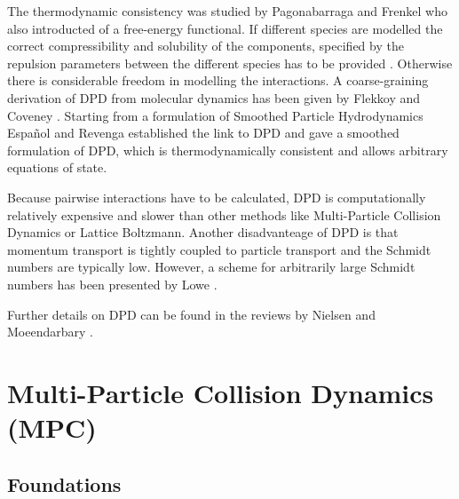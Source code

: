 \documentclass[8.5pt,twoside,twocolumn]{article}
\begin{document}
The thermodynamic consistency was studied by Pagonabarraga and Frenkel \cite{Pagonabarraga:2001} who also
introducted of a free-energy functional.
If different species are modelled the correct compressibility and solubility of the components, 
specified by the repulsion parameters between the different species has to be provided \cite{Groot:1997}.
Otherwise there is considerable freedom in modelling the interactions.
A coarse-graining derivation of DPD from molecular dynamics has been given by 
Flekkoy and Coveney \cite{Flekkoy:1999, Flekkoy:2000}. Starting from a 
formulation of Smoothed Particle Hydrodynamics Espa\~nol and Revenga \cite{Espanol:2003} 
established the link to DPD and gave a smoothed formulation of DPD, which 
is thermodynamically consistent and allows arbitrary equations of state. 

Because pairwise interactions have to be calculated, DPD is computationally relatively expensive and  
slower than other methods like Multi-Particle Collision Dynamics or Lattice Boltzmann.
Another disadvanteage of DPD is that momentum transport is tightly coupled to particle transport and the Schmidt numbers 
are typically low. However, a scheme for arbitrarily large Schmidt numbers has been presented by Lowe \cite{Lowe:2004}.

Further details on DPD can be found in the reviews by Nielsen \cite{Nielsen:2004} and 
Moeendarbary \cite{Moeendarbary:2009, Moeendarbary:2010}.



\section{Multi-Particle Collision Dynamics (MPC)}


\subsection{Foundations}
\end{document}
